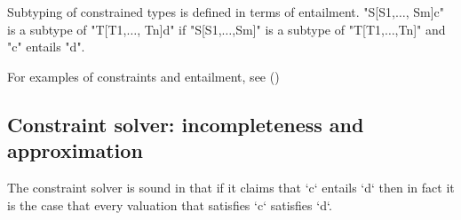 Subtyping of constrained types is defined in terms of entailment. 
\xcdmath"S[S1,$\ldots$, Sm]{c}" 
is a subtype of 
\xcdmath"T[T1,$\ldots$, Tn]{d}" 
if \xcdmath"S[S1,$\ldots$,Sm]" is a subtype of \xcdmath"T[T1,$\ldots$,Tn]" and
\xcd"c" entails \xcd"d".

For examples of constraints and entailment, see ()


\subsection{Constraint solver: incompleteness and approximation}



The constraint solver is sound in that if it claims that \xcd`c` entails \xcd`d`
then in fact it is the case that every valuation that satisfies \xcd`c`
satisfies \xcd`d`. 

